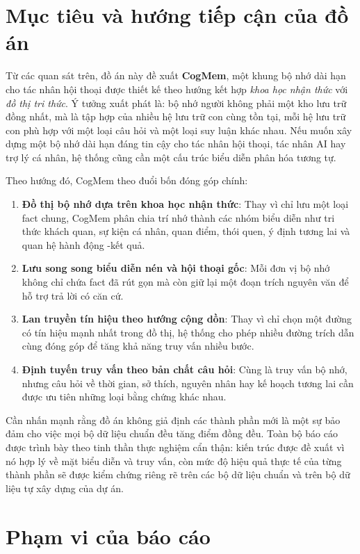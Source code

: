 \documentclass[../main.tex]{subfiles}
\begin{document}
\section{Mục tiêu và hướng tiếp cận của đồ án}

Từ các quan sát trên, đồ án này đề xuất \textbf{CogMem}, một khung bộ nhớ dài hạn cho tác nhân hội thoại được thiết kế theo hướng kết hợp \textit{khoa học nhận thức} với \textit{đồ thị tri thức}. Ý tưởng xuất phát là: bộ nhớ người không phải một kho lưu trữ đồng nhất, mà là tập hợp của nhiều hệ lưu trữ con cùng tồn tại, mỗi hệ lưu trữ con phù hợp với một loại câu hỏi và một loại suy luận khác nhau. Nếu muốn xây dựng một bộ nhớ dài hạn đáng tin cậy cho tác nhân hội thoại, tác nhân AI hay trợ lý cá nhân, hệ thống cũng cần một cấu trúc biểu diễn phân hóa tương tự.

Theo hướng đó, CogMem theo đuổi bốn đóng góp chính:

\begin{enumerate}
    \item \textbf{Đồ thị bộ nhớ dựa trên khoa học nhận thức}: Thay vì chỉ lưu một loại fact chung, CogMem phân chia trí nhớ thành các nhóm biểu diễn như tri thức khách quan, sự kiện cá nhân, quan điểm, thói quen, ý định tương lai và quan hệ hành động -kết quả.
    \item \textbf{Lưu song song biểu diễn nén và hội thoại gốc}: Mỗi đơn vị bộ nhớ không chỉ chứa fact đã rút gọn mà còn giữ lại một đoạn trích nguyên văn để hỗ trợ trả lời có căn cứ.
    \item \textbf{Lan truyền tín hiệu theo hướng cộng dồn}: Thay vì chỉ chọn một đường có tín hiệu mạnh nhất trong đồ thị, hệ thống cho phép nhiều đường trích dẫn cùng đóng góp để tăng khả năng truy vấn nhiều bước.
    \item \textbf{Định tuyến truy vấn theo bản chất câu hỏi}: Cùng là truy vấn bộ nhớ, nhưng câu hỏi về thời gian, sở thích, nguyên nhân hay kế hoạch tương lai cần được ưu tiên những loại bằng chứng khác nhau.
\end{enumerate}

Cần nhấn mạnh rằng đồ án không giả định các thành phần mới là một sự bảo đảm cho việc mọi bộ dữ liệu chuẩn đều tăng điểm đồng đều. Toàn bộ báo cáo được trình bày theo tinh thần thực nghiệm cẩn thận: kiến trúc được đề xuất vì nó hợp lý về mặt biểu diễn và truy vấn, còn mức độ hiệu quả thực tế của từng thành phần sẽ được kiểm chứng riêng rẽ trên các bộ dữ liệu chuẩn và trên bộ dữ liệu tự xây dựng của dự án.

\section{Phạm vi của báo cáo}
\end{document}
